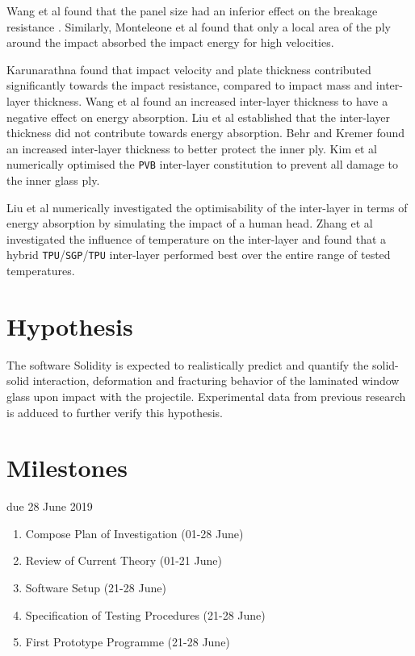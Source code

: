 \documentclass[12pt,twoside]{article}
\theoremstyle{break}
\begin{document}
\bigbreak
Wang et al \cite{Wan18} found that the panel size had an inferior effect on the breakage resistance \cite{Wan18}. Similarly, Monteleone et al \cite{Mon04} found that only a local area of the ply around the impact absorbed the impact energy for high velocities.

\bigbreak
Karunarathna \cite{Kar14} found that impact velocity and plate thickness contributed significantly towards the impact resistance, compared to impact mass and inter-layer thickness. Wang et al \cite{Wan18} found an increased inter-layer thickness to have a negative effect on energy absorption. Liu et al \cite{Liu16} established that the inter-layer thickness did not contribute towards energy absorption. Behr and Kremer \cite{Beh99} found an increased inter-layer thickness to better protect the inner ply. Kim et al \cite{Kim16} numerically optimised the \texttt{PVB} inter-layer constitution to prevent all damage to the inner glass ply.

\bigbreak
Liu et al \cite{Liu16} numerically investigated the optimisability of the inter-layer in terms of energy absorption by simulating the impact of a human head. Zhang et al \cite{Zha19} investigated the influence of temperature on the inter-layer and found that a hybrid \texttt{TPU}/\texttt{SGP}/\texttt{TPU} inter-layer performed best over the entire range of tested temperatures.

\section{Hypothesis}

The software Solidity is expected to realistically predict and quantify the solid-solid interaction, deformation and fracturing behavior of the laminated window glass upon impact with the projectile. Experimental data from previous research is adduced to further verify this hypothesis.

\section{Milestones}

{\color{red} due 28 June 2019}

\begin{enumerate}
    \item Compose Plan of Investigation (01-28 June)
    \item Review of Current Theory (01-21 June)
    \item Software Setup (21-28 June)
    \item Specification of Testing Procedures (21-28 June)
    \item First Prototype Programme (21-28 June)
\end{enumerate}
\end{document}
